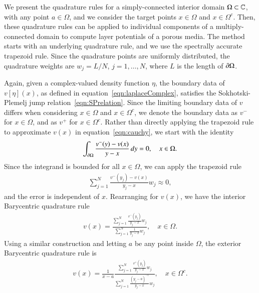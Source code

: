 \documentclass[preprint,10pt]{elsarticle}
\begin{document}
We present the quadrature rules for a simply-connected interior domain
$\Omega \subset {\mathbb{C}}$, with any point $a \in \Omega$, and we consider the
target points $x \in \Omega$ and $x \in \Omega^c$. Then, these
quadrature rules can be applied to individual components of a
multiply-connected domain to compute layer potentials of a porous media.
The method starts with an underlying quadrature rule, and we use the
spectrally accurate trapezoid rule.  Since the quadrature points are
uniformly distributed, the quadrature weights are $w_j = L/N$,
$j=1,\ldots,N$, where $L$ is the length of ${\partial}\Omega$.

Again, given a complex-valued density function $\eta$, the boundary data
of $v[\eta](x)$, as defined in equation~\eqref{eqn:laplaceComplex},
satisfies the Sokhotski-Plemelj jump relation~\eqref{eqn:SPrelation}.
Since the limiting boundary data of $v$ differs when considering $x \in
\Omega$ and $x \in \Omega^c$, we denote the boundary data as $v^-$ for
$x \in \Omega$, and as $v^+$ for $x \in \Omega^c$.  Rather than directly
applying the trapezoid rule to approximate $v(x)$ in
equation~\eqref{eqn:cauchy}, we start with the identity
\begin{align}
  \int_{{\partial}\Omega} \frac{v^{-}(y) - v(x)}{y - x} \,dy = 0,
    \quad x \in \Omega.
\end{align}
Since the integrand is bounded for all $x \in \Omega$, we can apply the
trapezoid rule
\begin{align}
  \sum_{j=1}^{N} \frac{v^{-}(y_j) - v(x)}{y_j - x} w_j \approx 0,
\end{align}
and the error is independent of $x$.  Rearranging for $v(x)$, we have
the interior Barycentric quadrature rule
\begin{align}
  v(x) = \frac{\sum\limits_{j=1}^N \frac{v^{-}(y_j)}{y_j - x} w_j}
  {\sum\limits_{j=1}^N \frac{1}{y_j - x} w_j}, \quad x \in \Omega.
  \label{eqn:BaryvInterior}
\end{align}
Using a similar construction and letting $a$ be any point inside
$\Omega$, the exterior Barycentric quadrature rule is
\begin{align}
  v(x) = \frac{1}{x-a} 
    \frac{\sum\limits_{j=1}^N \frac{v^+(y_j)}{y_j - x}w_j}
    {\sum\limits_{j=1}^N \frac{(y_j - a)^{-1}}{y_j - x}w_j},
    \quad x \in \Omega^c.
  \label{eqn:BaryvExterior}
\end{align}
\end{document}
